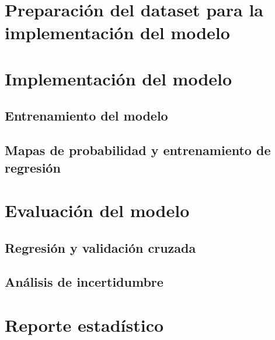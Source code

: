 \section{Preparación del dataset para la implementación del modelo}

\section{Implementación del modelo}
\subsection{Entrenamiento del modelo}
\subsection{Mapas de probabilidad y entrenamiento de regresión}

\section{Evaluación del modelo}
	\subsection{Regresión y validación cruzada}
	\subsection{Análisis de incertidumbre}


\section{Reporte estadístico}